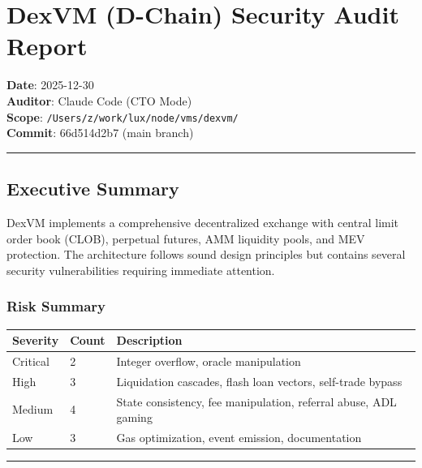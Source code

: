 \documentclass[
]{article}
\author{}
\date{}
\newcounter{none} %
\begin{document}
\section{DexVM (D-Chain) Security Audit
Report}\label{dexvm-d-chain-security-audit-report}

\textbf{Date}: 2025-12-30\\
\textbf{Auditor}: Claude Code (CTO Mode)\\
\textbf{Scope}: \texttt{/Users/z/work/lux/node/vms/dexvm/}\\
\textbf{Commit}: 66d514d2b7 (main branch)

\begin{center}\rule{0.5\linewidth}{0.5pt}\end{center}

\subsection{Executive Summary}\label{executive-summary}

DexVM implements a comprehensive decentralized exchange with central
limit order book (CLOB), perpetual futures, AMM liquidity pools, and MEV
protection. The architecture follows sound design principles but
contains several security vulnerabilities requiring immediate attention.

\subsubsection{Risk Summary}\label{risk-summary}

{\def\LTcaptype{none} %
\begin{longtable}[]{@{}lll@{}}
\toprule\noalign{}
Severity & Count & Description \\
\midrule\noalign{}
\endhead
\bottomrule\noalign{}
\endlastfoot
Critical & 2 & Integer overflow, oracle manipulation \\
High & 3 & Liquidation cascades, flash loan vectors, self-trade
bypass \\
Medium & 4 & State consistency, fee manipulation, referral abuse, ADL
gaming \\
Low & 3 & Gas optimization, event emission, documentation \\
\end{longtable}
}

\begin{center}\rule{0.5\linewidth}{0.5pt}\end{center}
\end{document}
